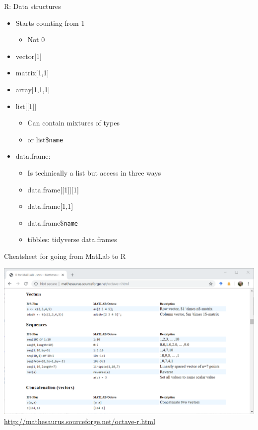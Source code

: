 \documentclass[ignorenonframetext,]{beamer}
\providecommand{\tightlist}{%
  \setlength{\itemsep}{0pt}\setlength{\parskip}{0pt}}
\begin{document}
\begin{frame}[fragile]{R: Data structures}
\protect\hypertarget{r-data-structures}{}

\begin{itemize}
\tightlist
\item
  Starts counting from 1

  \begin{itemize}
  \tightlist
  \item
    Not 0
  \end{itemize}
\item
  vector{[}1{]}
\item
  matrix{[}1,1{]}
\item
  array{[}1,1,1{]}
\item
  list{[}{[}1{]}{]}

  \begin{itemize}
  \tightlist
  \item
    Can contain mixtures of types
  \item
    or list\$\texttt{name}
  \end{itemize}
\item
  data.frame:

  \begin{itemize}
  \tightlist
  \item
    Is technically a list but access in three ways
  \item
    data.frame{[}{[}1{]}{]}{[}1{]}
  \item
    data.frame{[}1,1{]}
  \item
    data.frame\$\texttt{name}
  \item
    tibbles: tidyverse data.frames
  \end{itemize}
\end{itemize}

\end{frame}

\begin{frame}{Cheatsheet for going from MatLab to R}
\protect\hypertarget{cheatsheet-for-going-from-matlab-to-r}{}

\includegraphics{../external/images/r_cheatsheet_matlab.PNG}
\url{http://mathesaurus.sourceforge.net/octave-r.html}

\end{frame}
\end{document}

